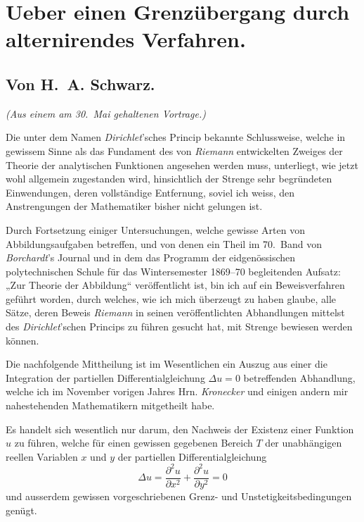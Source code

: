 \documentclass{article}
\begin{document}

\section*{Ueber einen Grenzübergang durch alternirendes Verfahren.}

\subsection*{Von \textbf{H.~A. Schwarz.}}

\emph{(Aus einem am 30.~Mai gehaltenen Vortrage.)}


Die unter dem Namen \emph{Dirichlet}'sches Princip bekannte Schlussweise, welche in gewissem Sinne als das Fundament des von \emph{Riemann} entwickelten Zweiges der Theorie der analytischen Funktionen angesehen werden muss, unterliegt, wie jetzt wohl allgemein zugestanden wird, hinsichtlich der Strenge sehr begründeten Einwendungen, deren vollständige Entfernung, soviel ich weiss, den Anstrengungen der Mathematiker bisher nicht gelungen ist.

Durch Fortsetzung einiger Untersuchungen, welche gewisse Arten von Abbildungsaufgaben betreffen, und von denen ein Theil im 70.~Band von \emph{Borchardt}'s Journal und in dem das Programm der eidgenössischen polytechnischen Schule für das Wintersemester 1869--70 begleitenden Aufsatz: „Zur Theorie der Abbildung“ veröffentlicht ist, bin ich auf ein Beweisverfahren geführt worden, durch welches, wie ich mich überzeugt zu haben glaube, alle Sätze, deren Beweis \emph{Riemann} in seinen veröffentlichten Abhandlungen mittelst des \emph{Dirichlet}'schen Princips zu führen gesucht hat, mit Strenge bewiesen werden können.


Die nachfolgende Mittheilung ist im Wesentlichen ein Auszug aus einer die Integration der partiellen Differentialgleichung $\Delta u = 0$ betreffenden Abhandlung, welche ich im November vorigen Jahres Hrn. \emph{Kronecker} und einigen andern mir nahestehenden Mathematikern mitgetheilt habe.

Es handelt sich wesentlich nur darum, den Nachweis der Existenz einer Funktion $u$ zu führen, welche für einen gewissen gegebenen Bereich $T$ der unabhängigen reellen Variablen $x$ und $y$ der partiellen Differentialgleichung
\[
\Delta u = \frac{\partial^2 u}{\partial x^2} + \frac{\partial^2 u}{\partial y^2} = 0
\]
und ausserdem gewissen vorgeschriebenen Grenz- und Unstetigkeitsbedingungen genügt.
\end{document}
